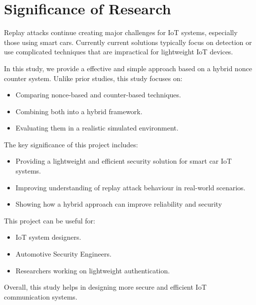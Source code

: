 \documentclass[a4paper,man,12pt]{article}
\begin{document}
\section{Significance of Research}

  
Replay attacks continue creating major challenges for IoT systems, especially those using smart cars. Currently current solutions typically focus on detection or use complicated techniques that are impractical for lightweight IoT devices.\bigbreak

In this study, we provide a effective and simple approach based on a hybrid nonce counter system. Unlike prior studies, this study focuses on:

\begin{itemize}
  \item Comparing nonce-based and counter-based techniques.
  \item Combining both into a hybrid framework.
  \item Evaluating them in a realistic simulated environment.
\end{itemize}

\bigbreak
The key significance of this project includes:

\begin{itemize}
  \item Providing a lightweight and efficient security solution for smart car IoT systems.
  \item Improving understanding of replay attack behaviour in real-world scenarios.
\item Showing how a hybrid approach can improve reliability and security
\end{itemize}
\bigbreak

This project can be useful for:
\begin{itemize}
  \item IoT system designers.
  \item Automotive Security Engineers.
  \item Researchers working on lightweight authentication.
\end{itemize}

Overall, this study helps in designing more secure and efficient IoT communication systems.
\pagebreak

\end{document}
